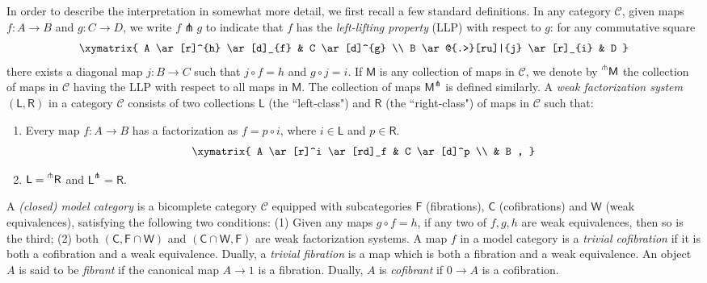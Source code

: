 \documentclass[reqno,12pt]{amsart}
\newcommand{\leftexp}[2]{{\vphantom{#2}}^{#1}{#2}}
\renewcommand{\to}{\rightarrow}
\newcommand{\F}{\ensuremath{\mathsf{F}}}
\newcommand{\M}{\ensuremath{\mathsf{M}}}
\renewcommand{\L}{\ensuremath{\mathsf{L}}}
\newcommand{\R}{\ensuremath{\mathsf{R}}}
\newcommand{\W}{\ensuremath{\mathsf{W}}}
\newcommand{\C}{\ensuremath{\mathcal{C}}}
\newcommand{\sfC}{\ensuremath{\mathsf{C}}}
\theoremstyle{definition}
\theoremstyle{remark}
\begin{document}
In order to describe the interpretation in somewhat more detail, we first recall a few standard definitions.
In any category $\C$, given maps $f : A\to B$ and $g : C\to D$, we write $f\pitchfork g$ 
to indicate that $f$ has the \emph{left-lifting property} (LLP) with respect to $g$: for any commutative square 
\[  
\xymatrix{
   A   
    \ar[r]^{h}
    \ar[d]_{f}
    &
   C
    \ar[d]^{g}
    \\
    B 
    \ar@{.>}[ru]|{j}
    \ar[r]_{i}
    &
    D
  }
\]
there exists a diagonal map  $j: B\to C$ such that $j\circ f = h$ and $g\circ j = i$. If $\M$ is any 
collection of maps in $\C$, we denote by $\leftexp{\pitchfork}{\M}$ the collection of maps in 
$\C$ having the LLP with respect to all maps in $\M$. The collection of maps $\M^{\pitchfork}$ is defined similarly. 
A \emph{weak factorization system} $(\L, \R)$ in a category $\C$ consists of two collections $\L$ (the ``left-class") and $\R$ (the ``right-class") of maps in $\C$ such that:\
\begin{enumerate} 
\item Every map $f : A\to B$ has a factorization as $f=p\circ i$, where $i \in \L$ and $p \in\R$. 
\[
\xymatrix{
A 
\ar[r]^i
\ar[rd]_f
&
C 
\ar[d]^p
\\
& B ,
}
\] 

\item $\L= \leftexp{\pitchfork}{\R}$ and $\L^\pitchfork =\R$. 
\end{enumerate}

A \emph{(closed) model category} \cite{Quillen:HA} is a bicomplete category $\C$ equipped with subcategories 
$\F$ (fibrations), $\sfC$ (cofibrations) and $\W$ (weak equivalences), satisfying the following two 
conditions: (1) Given any maps $g\circ f = h$, if any two of $f, g, h$ are weak equivalences, then so is the third; (2)
both $(\sfC, \F \cap \W)$ and $(\sfC \cap \W, \F)$ are weak factorization systems. 
A map $f$ in a model category is a \emph{trivial cofibration} if it is both a cofibration and a weak 
equivalence. Dually, a \emph{trivial fibration} is a map which is both a fibration and a weak equivalence. An object $A$ is said to be \emph{fibrant} if the canonical map $A\to1$ is a fibration. Dually, $A$ is \emph{cofibrant} if $0\to A$ is a cofibration. 
\end{document}
